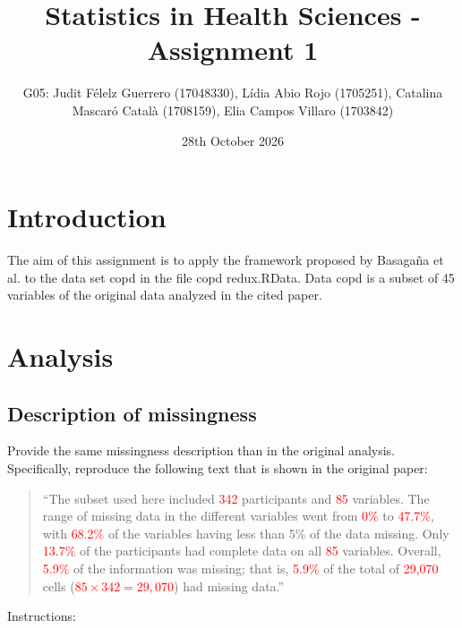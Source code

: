 \documentclass[a4paper,10pt]{article}\usepackage[]{graphicx}\usepackage[]{xcolor}
\begin{document}
\title{Statistics in Health Sciences - Assignment 1}
\author{G05: Judit Félelz Guerrero (17048330), Lídia Abio Rojo (1705251), Catalina Mascaró Català (1708159), Elia Campos Villaro (1703842)}
\date{28th October 2026}



\maketitle

\newpage

\section{Introduction}
The aim of this assignment is to apply the framework proposed by Basagaña et al. to the data set copd in the file copd redux.RData. Data copd is a subset of 45 variables of the original data analyzed in the cited paper.


\section{Analysis}

\subsection{Description of missingness}

Provide the same missingness description than in the original analysis. Specifically, reproduce the following text that is shown in the original paper:

\begin{quotation}
``The subset used here included \textcolor{red}{342} participants and \textcolor{red}{85} variables. The range of missing data in the different variables went from \textcolor{red}{0\%} to \textcolor{red}{47.7\%}, with \textcolor{red}{68.2\%} of the variables having less than 5\% of the data missing. Only \textcolor{red}{13.7\%} of the participants had complete data on all \textcolor{red}{85} variables. Overall, \textcolor{red}{5.9\%} of the information was missing; that is, \textcolor{red}{5.9\%} of the total of \textcolor{red}{29,070} cells (\textcolor{red}{$85 \times 342 = 29,070$}) had missing data.''
\end{quotation}

Instructions:
\end{document}

